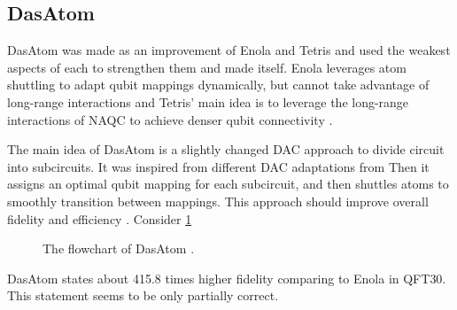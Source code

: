 \subsection{DasAtom}
DasAtom was made as an improvement of Enola and Tetris 
and used the weakest aspects of each to strengthen them and made itself.
Enola leverages atom shuttling to adapt qubit mappings dynamically,
but cannot take advantage of long-range interactions
and Tetris' main idea is to leverage the long-range interactions of \ac{NAQC} 
to achieve denser qubit connectivity \parencite{10082942,Tan_2025_Enola, huang2025dasatomdivideandshuttleatomapproach}.

The main idea of DasAtom is a slightly changed \ac{DAC} approach to divide circuit into subcircuits.
It was inspired from different DAC adaptations from \parencite{siraichi:hal-02316820, 10.1145/3508352.3549394, huang2024qubitmappingadaptivedivideandconquer}
Then it assigns an optimal qubit mapping for each subcircuit, and then shuttles
atoms to smoothly transition between mappings. This approach should improve overall fidelity and efficiency \parencite{huang2025dasatomdivideandshuttleatomapproach}.
Consider \ref{fig:DasAtomFlowChart}

\begin{figure}
\centering
{}
\caption{The flowchart of DasAtom \parencite{huang2025dasatomdivideandshuttleatomapproach}.}
\label{fig:DasAtomFlowChart}
\end{figure}

DasAtom states about 415.8 times higher fidelity comparing to Enola in \ac{QFT}30. 
This statement seems to be only partially correct.
\parencite{huang2025dasatomdivideandshuttleatomapproach}